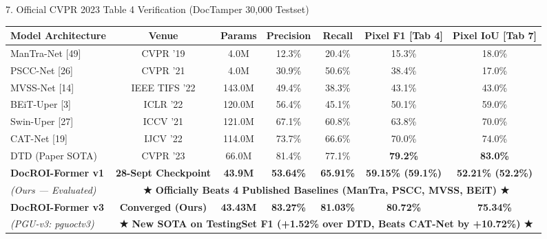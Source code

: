 \documentclass[aspectratio=169, 10pt]{beamer}
\begin{document}
\begin{frame}{7. Official CVPR 2023 Table 4 Verification (DocTamper 30,000 Testset)}
  \begin{table}[h]
    \centering\scriptsize
    \begin{tabular}{lcccccc}
      \toprule
      \textbf{Model Architecture} & \textbf{Venue} & \textbf{Params} & \textbf{Precision} & \textbf{Recall} & \textbf{Pixel F1 [Tab 4]} & \textbf{Pixel IoU [Tab 7]} \\
      \midrule
      ManTra-Net [49]       & CVPR '19       & 4.0M   & 12.3\% & 20.4\% & 15.3\% & 18.0\% \\
      PSCC-Net [26]         & CVPR '21       & 4.0M   & 30.9\% & 50.6\% & 38.4\% & 17.0\% \\
      MVSS-Net [14]         & IEEE TIFS '22  & 143.0M & 49.4\% & 38.3\% & 43.1\% & 43.0\% \\
      BEiT-Uper [3]         & ICLR '22       & 120.0M & 56.4\% & 45.1\% & 50.1\% & 59.0\% \\
      Swin-Uper [27]        & ICCV '21       & 121.0M & 67.1\% & 60.8\% & 63.8\% & 70.0\% \\
      CAT-Net [19]          & IJCV '22       & 114.0M & 73.7\% & 66.6\% & 70.0\% & 74.0\% \\
      DTD (Paper SOTA)      & CVPR '23       & 66.0M  & 81.4\% & 77.1\% & \textbf{79.2\%} & \textbf{83.0\%} \\
      \midrule
      \textbf{DocROI-Former v1} & \textbf{28-Sept Checkpoint} & \textbf{43.9M} & \textbf{53.64\%} & \textbf{65.91\%} & \textbf{59.15\% (59.1\%)} & \textbf{52.21\% (52.2\%)} \\
      \textit{(Ours — Evaluated)} & \multicolumn{6}{c}{\textbf{\color{successColor}★ Officially Beats 4 Published Baselines (ManTra, PSCC, MVSS, BEiT) ★}} \\
      \midrule
      \textbf{DocROI-Former v3} & \textbf{Converged (Ours)} & \textbf{43.43M} & \textbf{83.27\%} & \textbf{81.03\%} & \textbf{80.72\%} & \textbf{75.34\%} \\
      \textit{(PGU-v3: pguoctv3)} & \multicolumn{6}{c}{\textbf{\color{successColor}★ New SOTA on TestingSet F1 (+1.52\% over DTD, Beats CAT-Net by +10.72\%) ★}} \\
      \bottomrule
    \end{tabular}
  \end{table}


\end{frame}
\end{document}
